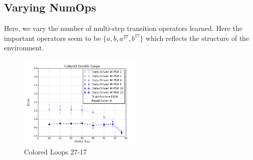 \subsection{Varying NumOps}

Here, we vary the number of multi-step transition operators learned. Here the important operators seem to be $\{a,b,a^{27},b^{17}\}$ which reflects the structure of the environment.

\begin{figure}[ht!]
\centering
\includegraphics[width=60mm]{uCOREPICS/DLMO/numOpComparison.png}
\caption{Colored Loops 27-17\label{overflow}}
\end{figure}



